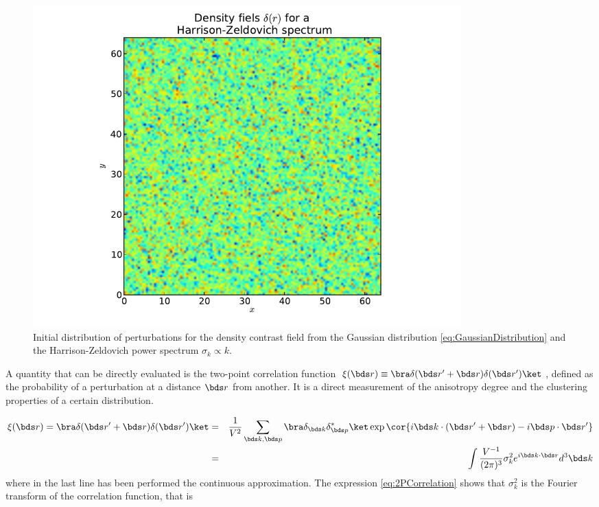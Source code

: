 \begin{figure}[htbp]
	\centering
	\includegraphics[width=0.8\textwidth]
	{./figures/2_theoretical_framework/Initial_Density.pdf}

	\caption{\small{Initial distribution of perturbations for the density 
	contrast field from the Gaussian distribution 
	\ref{eq:GaussianDistribution} and the Harrison-Zeldovich power spectrum
	$\sigma_k \propto k$.}}	
	\label{fig:InitialDensity}
\end{figure}


A quantity that can be directly evaluated is the two-point correlation 
function $\xi(\bds r) \equiv \bra \delta(\bds r' + \bds r) \delta(\bds r') 
\ket$, defined as the probability of a perturbation at a distance $\bds r$ 
from another. It is a direct measurement of the anisotropy degree and the 
clustering properties of a certain distribution.


\begin{eqnarray}
\nonumber
\xi(\bds r) = \bra \delta(\bds r' + \bds r) \delta(\bds r') \ket &=& 
\frac{1}{V^2}\sum_{\bds k, \bds p} \bra \delta_{\bds k} \delta_{\bds p}^*\ket
\exp\cor{ i\bds k \cdot(\bds r' + \bds r)- i\bds p \cdot \bds r' } \\
\label{eq:2PCorrelation}
&=& \int \frac{V^{-1}}{(2\pi)^3}\sigma_k^2 e^{i \bds k \cdot \bds r} d^3 \bds k
\end{eqnarray}
where in the last line has been performed the continuous approximation. 
The expression \ref{eq:2PCorrelation} shows that $\sigma_k^2$ is the
Fourier transform of the correlation function, that is



